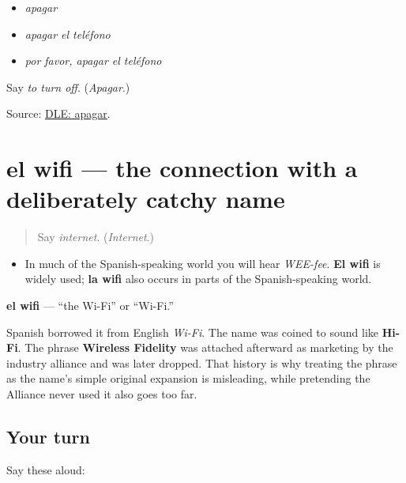\begin{itemize}
\raggedright
  \item \emph{apagar}
  \item \emph{apagar el teléfono}
  \item \emph{por favor, apagar el teléfono}
\end{itemize}

\begin{tcolorbox}[breakable,colback=teal!4,colframe=teal!35!black,title={Before you move on}]
Say \emph{to turn off}. (\emph{Apagar}.)

Source: \href{https://dle.rae.es/apagar}{DLE: apagar}.
\end{tcolorbox}
\section[el wifi]{el wifi — the connection with a deliberately catchy name}

\label{lesson:ES-C404-wifi}



\begin{quote}
Say \emph{internet}. (\emph{Internet}.)
\end{quote}

\begin{sounds}
\begin{itemize}
\raggedright
  \item In much of the Spanish-speaking world you will hear \emph{WEE-fee}. \textbf{El wifi} is widely used; \textbf{la wifi} also occurs in parts of the Spanish-speaking world.
\end{itemize}
\end{sounds}

\begin{cousinweb}
\textbf{el wifi} — “the Wi-Fi” or “Wi-Fi.”

Spanish borrowed it from English \emph{Wi-Fi}. The name was coined to sound like \textbf{Hi-Fi}. The phrase \textbf{Wireless Fidelity} was attached afterward as marketing by the industry alliance and was later dropped. That history is why treating the phrase as the name's simple original expansion is misleading, while pretending the Alliance never used it also goes too far.
\end{cousinweb}

\subsection*{Your turn}
Say these aloud:

